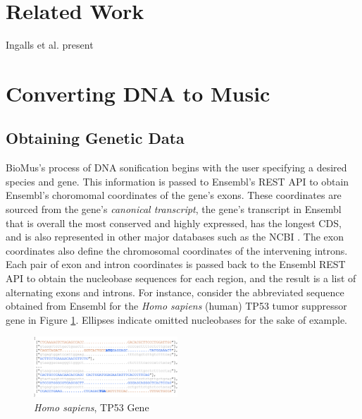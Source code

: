 \documentclass[letterpaper]{article}
\begin{document}
\section{Related Work}

Ingalls et al. present 




\section{Converting DNA to Music}
\subsection{Obtaining Genetic Data}
BioMus's process of DNA sonification begins with the user specifying a desired species and gene. This information is passed to Ensembl's REST API to obtain Ensembl's choromomal coordinates of the gene's exons. These coordinates are sourced from the gene's \textit{canonical transcript}, the gene's transcript in Ensembl that is overall the most conserved and highly expressed, has the longest CDS, and is also represented in other major databases such as the NCBI \cite{ensembl_transcript_flags}. The exon coordinates also define the chromosomal coordinates of the intervening introns. Each pair of exon and intron coordinates is passed back to the Ensembl REST API to obtain the nucleobase sequences for each region, and the result is a list of alternating exons and introns. For instance, consider the abbreviated sequence obtained from Ensembl for the \textit{Homo sapiens} (human) TP53 tumor suppressor gene in Figure \ref{fig:pre_processed_seq_homo_sapiens_tp53}. Ellipses indicate omitted nucleobases for the sake of example.

\begin{figure}[h!]
\centering
\includegraphics[width=0.48\textwidth]{images/pre_processed_seq_homo_sapiens_tp53_ABBREV}
  \caption{\textit{Homo sapiens}, TP53 Gene}\label{fig:pre_processed_seq_homo_sapiens_tp53}
  \vspace{-3mm}
\end{figure}
\end{document}
